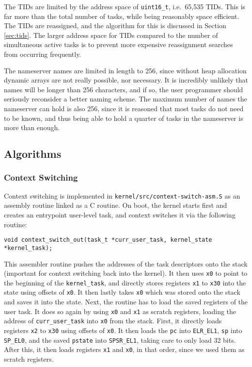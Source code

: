 \documentclass[12pt, titlepage]{article}
\begin{document}
    The TIDs are limited by the address space of \verb`uint16_t`, i.e.\ 65,535 TIDs. This is far more than the total number of tasks, while being reasonably space efficient. The TIDs are reassigned, and the algorithm for this is discussed in Section \ref{sec:tids}. The larger address space for TIDs compared to the number of simultaneous active tasks is to prevent more expensive reassignment searches from occurring frequently.

    The nameserver names are limited in length to 256, since without heap allocation dynamic arrays are not really possible, nor necessary. It is incredibly unlikely that names will be longer than 256 characters, and if so, the user programmer should seriously reconsider a better naming scheme. The maximum number of names the nameserver can hold is also 256, since it is reasoned that most tasks do not need to be known, and thus being able to hold a quarter of tasks in the nameserver is more than enough.

    \subsection{Algorithms}

    \subsubsection{Context Switching}
    \label{sec:context-switch}

    Context switching is implemented in \verb`kernel/src/context-switch-asm.S` as an assembly routine linked as a C routine. On boot, the kernel starts first and creates an entrypoint user-level task, and context switches it via the following routine:
    \begin{verbatim}
void context_switch_out(task_t *curr_user_task, kernel_state *kernel_task);
    \end{verbatim}
    This assembler routine pushes the addresses of the task descriptors onto the stack (important for context switching back into the kernel). It then uses \verb`x0` to point to the beginning of the \verb`kernel_task`, and directly stores registers \verb`x1` to \verb`x30` into the state using offsets of \verb`x0`. It then lastly takes \verb`x0` which was stored onto the stack and saves it into the state. Next, the routine has to load the saved registers of the user task. It does so again by using \verb`x0` and \verb`x1` as scratch registers, loading the address of \verb`curr_user_task` into \verb`x0` from the stack. First, it directly loads registers \verb`x2` to \verb`x30` using offsets of \verb`x0`. It then loads the \verb`pc` into \verb`ELR_EL1`, \verb`sp` into \verb`SP_EL0`, and the saved \verb`pstate` into \verb`SPSR_EL1`, taking care to only load 32 bits. After this, it then loads registers \verb`x1` and \verb`x0`, in that order, since we used them as scratch registers.
\end{document}
